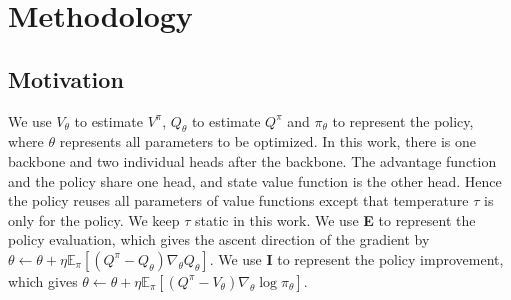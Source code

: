 \section{Methodology}
\label{sec:casa}

\subsection{Motivation}
\label{sec:motivation}
We use $V_{\theta}$ to estimate $V^\pi$, $Q_{\theta}$ to estimate $Q^\pi$ and $\pi_{\theta}$ to represent the policy,
where $\theta$ represents all parameters to be optimized.
{ In this work, there is one backbone and two individual heads after the backbone. 
The advantage function and the policy share one head, and state value function is the other head. 
Hence the policy reuses all parameters of value functions except that temperature $\tau$ is only for the policy.
We keep $\tau$ static in this work.}
We use \textbf{E} to represent the policy evaluation, which gives the ascent direction of the gradient by $\theta \leftarrow \theta + \eta \mathbb{E}_{\pi} [(Q^{\pi} - Q_{\theta}) \nabla_{\theta} Q_{\theta}]$. 
We use \textbf{I} to represent the policy improvement, which gives
$\theta \leftarrow \theta + \eta \mathbb{E}_\pi [(Q^\pi-V_\theta) \nabla_\theta \log \pi_\theta]$.

